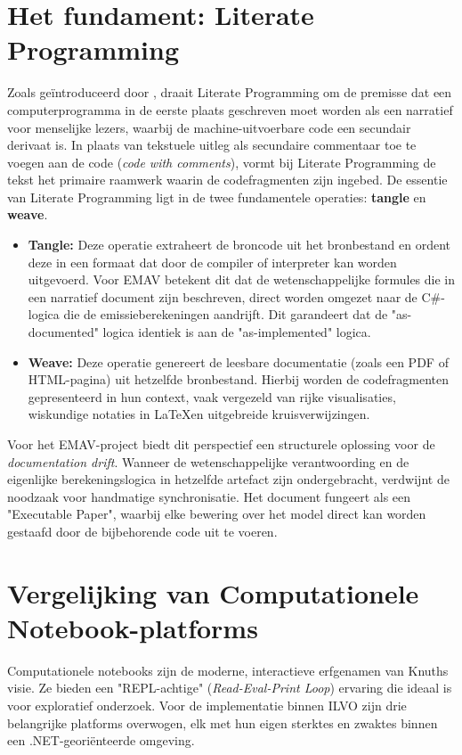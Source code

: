 \section{Het fundament: Literate Programming}
Zoals geïntroduceerd door \textcite{Knuth1984}, draait Literate Programming om de premisse dat een computerprogramma in de eerste plaats geschreven moet worden als een narratief voor menselijke lezers, waarbij de machine-uitvoerbare code een secundair derivaat is. In plaats van tekstuele uitleg als secundaire commentaar toe te voegen aan de code (\textit{code with comments}), vormt bij Literate Programming de tekst het primaire raamwerk waarin de codefragmenten zijn ingebed.
De essentie van Literate Programming ligt in de twee fundamentele operaties: \textbf{tangle} en \textbf{weave}. 
\begin{itemize}
    \item \textbf{Tangle:} Deze operatie extraheert de broncode uit het bronbestand en ordent deze in een formaat dat door de compiler of interpreter kan worden uitgevoerd. Voor EMAV betekent dit dat de wetenschappelijke formules die in een narratief document zijn beschreven, direct worden omgezet naar de C\#-logica die de emissieberekeningen aandrijft. Dit garandeert dat de "as-documented" logica identiek is aan de "as-implemented" logica.
    \item \textbf{Weave:} Deze operatie genereert de leesbare documentatie (zoals een PDF of HTML-pagina) uit hetzelfde bronbestand. Hierbij worden de codefragmenten gepresenteerd in hun context, vaak vergezeld van rijke visualisaties, wiskundige notaties in \LaTeX \@ en uitgebreide kruisverwijzingen.
\end{itemize}
Voor het EMAV-project biedt dit perspectief een structurele oplossing voor de \textit{documentation drift}. Wanneer de wetenschappelijke verantwoording en de eigenlijke berekeningslogica in hetzelfde artefact zijn ondergebracht, verdwijnt de noodzaak voor handmatige synchronisatie. Het document fungeert als een "Executable Paper", waarbij elke bewering over het model direct kan worden gestaafd door de bijbehorende code uit te voeren.
\section{Vergelijking van Computationele Notebook-platforms}
Computationele notebooks zijn de moderne, interactieve erfgenamen van Knuths visie. Ze bieden een "REPL-achtige" (\textit{Read-Eval-Print Loop}) ervaring die ideaal is voor exploratief onderzoek. Voor de implementatie binnen ILVO zijn drie belangrijke platforms overwogen, elk met hun eigen sterktes en zwaktes binnen een .NET-georiënteerde omgeving.
